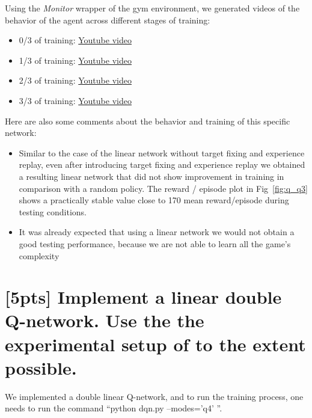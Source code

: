 \documentclass{article}
\begin{document}
Using the \textit{Monitor} wrapper of the gym environment, we generated videos of the behavior of the agent across different stages of training:

\begin{itemize}
  \item 0/3 of training: \href{https://youtu.be/fKvWyR8PrZc}{Youtube video}
  \item 1/3 of training: \href{https://youtu.be/NRdpff7ivfA}{Youtube video}
  \item 2/3 of training: \href{https://youtu.be/i-Voiqwufic}{Youtube video}
  \item 3/3 of training: \href{https://youtu.be/CXvo_i6CVeM}{Youtube video}
\end{itemize}

Here are also some comments about the behavior and training of this specific network:

\begin{itemize}
  \item Similar to the case of the linear network without target fixing and experience replay, even after introducing target fixing and experience replay we obtained a resulting linear network that did not show improvement in training in comparison with a random policy. The reward / episode plot in Fig~\ref{fig:q_q3} shows a practically stable value close to 170 mean reward/episode during testing conditions.
  \item It was already expected that using a linear network we would not obtain a good testing performance, because we are not able to learn all the game's complexity
\end{itemize}

\section{[5pts] Implement a linear double Q-network. Use the the experimental setup of \cite{mnih2013playing,mnih2015human} to the extent possible.}

We implemented a double linear Q-network, and to run the training process, one needs to run the command ``python dqn.py --modes='q4' ''.
\end{document}
